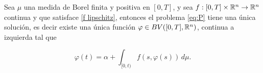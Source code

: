 \newpage
\begin{thm}\label{th:picar}
    Sea $\mu$ una medida de Borel finita y positiva en $[0,T]$, y sea $f:[0,T]\times\mathbb{R}^n\to\mathbb{R}^n$ continua y que satisface \ref{f lipschitz}, entonces el problema \eqref{eq:P} tiene una única solución, es decir existe una única función $\varphi\in BV([0,T],\mathbb{R}^n)$, continua a izquierda tal que 
 
    \begin{equation*}
        \varphi(t)=\alpha + \int_{[0,t)}f(s,\varphi(s))\, d\mu.
    \end{equation*}
\end{thm}
